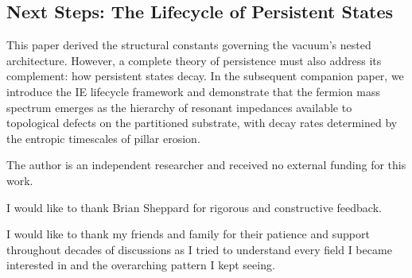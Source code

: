 \subsection{Next Steps: The Lifecycle of Persistent States}

This paper derived the structural constants governing the vacuum's nested architecture. However, a complete theory of persistence must also address its complement: how persistent states decay. In the subsequent companion 
paper, we introduce the IE lifecycle framework and demonstrate that the fermion mass spectrum emerges as 
the hierarchy of resonant impedances available to topological defects on the partitioned substrate, with 
decay rates determined by the entropic timescales of pillar erosion.

\begin{acknowledgments}
The author is an independent researcher and received no external funding for this work. 

I would like to thank Brian Sheppard for rigorous and constructive feedback.

I would like to thank my friends and family for their patience and support throughout decades of discussions as I tried to understand every field I became interested in and the overarching pattern I kept seeing.
\end{acknowledgments}